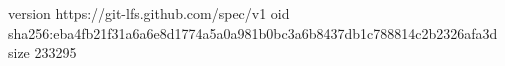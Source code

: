 version https://git-lfs.github.com/spec/v1
oid sha256:eba4fb21f31a6a6e8d1774a5a0a981b0bc3a6b8437db1c788814c2b2326afa3d
size 233295
